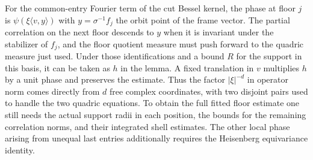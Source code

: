 For the common-entry Fourier term of the cut Bessel kernel, the phase at floor $j$ is $\psi(\xi\langle v,y\rangle)$ with $y=\sigma^{-1}f_j$ the orbit point of the frame vector. The partial correlation on the next floor descends to $y$ when it is invariant under the stabilizer of $f_j$, and the floor quotient measure must push forward to the quadric measure just used. Under those identifications and a bound $R$ for the support in this basis, it can be taken as $h$ in the lemma. A fixed translation in $v$ multiplies $h$ by a unit phase and preserves the estimate. Thus the factor $|\xi|^{-d}$ in operator norm comes directly from $d$ free complex coordinates, with two disjoint pairs used to handle the two quadric equations. To obtain the full fitted floor estimate one still needs the actual support radii in each position, the bounds for the remaining correlation norms, and their integrated shell estimates. The other local phase arising from unequal last entries additionally requires the Heisenberg equivariance identity.
